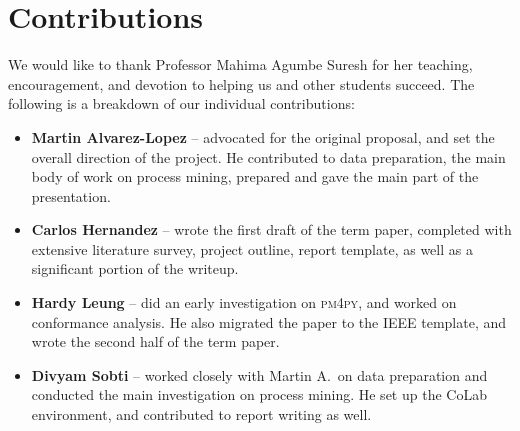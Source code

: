 \documentclass[conference]{IEEEtran}
\begin{document}
\section{Contributions}

We would like to thank Professor Mahima Agumbe Suresh for her teaching,
encouragement, and devotion to helping us and other students succeed.
The following is a breakdown of our individual contributions:

\begin{itemize}
\item \textbf{Martin Alvarez-Lopez} -- advocated for the original proposal,
and set the overall direction of the project. He contributed to
data preparation, the main body of work on process mining, prepared
and gave the main part of the presentation.

\item
\textbf{Carlos Hernandez} -- wrote the first draft of the term paper,
completed with extensive literature survey, project outline,
report template, as well as a significant portion of the writeup.

\item
\textbf{Hardy Leung} -- did an early investigation on \textsc{pm4py}, and
worked on conformance analysis. He also migrated the paper to the IEEE
template, and wrote the second half of the term paper.

\item
\textbf{Divyam Sobti} -- worked closely with Martin A.~on data preparation and
conducted the main investigation on process mining. He set up the CoLab
environment, and contributed to report writing as well.

\end{itemize}
\end{document}
